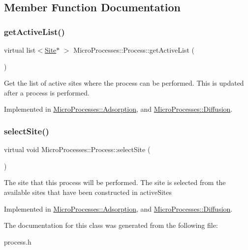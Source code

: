 \subsection{Member Function Documentation}
\mbox{\label{classMicroProcesses_1_1Process_ab2b962d50cca475005fd6d6477258e58}} 
\subsubsection{\texorpdfstring{get\+Active\+List()}{getActiveList()}}
{\footnotesize\ttfamily virtual list$<$\mbox{\hyperlink{classSurfaceTiles_1_1Site}{Site}}$\ast$ $>$ Micro\+Processes\+::\+Process\+::get\+Active\+List (\begin{DoxyParamCaption}{ }\end{DoxyParamCaption})\hspace{0.3cm}{\ttfamily [pure virtual]}}

Get the list of active sites where the process can be performed. This is updated after a process is performed. 

Implemented in \mbox{\hyperlink{classMicroProcesses_1_1Adsorption_ac8bab3e2a04a6ea204c8f31077fb83fb}{Micro\+Processes\+::\+Adsorption}}, and \mbox{\hyperlink{classMicroProcesses_1_1Diffusion_a8e19130f8f9948f1a6a446f4065027dd}{Micro\+Processes\+::\+Diffusion}}.

\mbox{\label{classMicroProcesses_1_1Process_a5b0a36197e03be4f36465a6b9d4f867f}} 
\subsubsection{\texorpdfstring{select\+Site()}{selectSite()}}
{\footnotesize\ttfamily virtual void Micro\+Processes\+::\+Process\+::select\+Site (\begin{DoxyParamCaption}{ }\end{DoxyParamCaption})\hspace{0.3cm}{\ttfamily [pure virtual]}}

The site that this process will be performed. The site is selected from the available sites that have been constructed in active\+Sites 

Implemented in \mbox{\hyperlink{classMicroProcesses_1_1Adsorption_af20402b5bfbc7b627ad8de13bdc2c541}{Micro\+Processes\+::\+Adsorption}}, and \mbox{\hyperlink{classMicroProcesses_1_1Diffusion_af699c30b1c182cce03e9a9826b0c5b51}{Micro\+Processes\+::\+Diffusion}}.



The documentation for this class was generated from the following file\+:\begin{DoxyCompactItemize}
\item 
process.\+h\end{DoxyCompactItemize}
